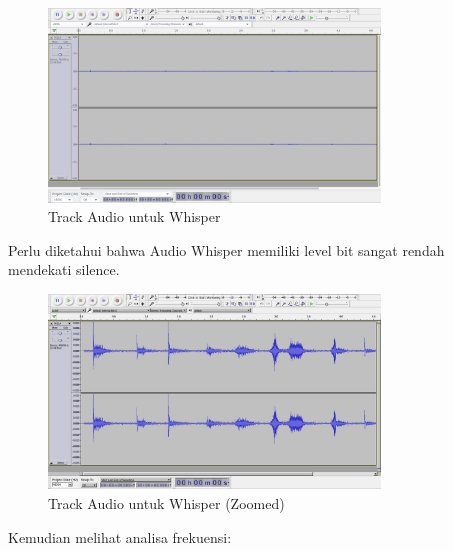 \documentclass[12pt,]{article}
\begin{document}
	\begin{figure}[!ht]
		\centering
		\includegraphics[width=250pt]{images/elitech_testAudioWhisperOri}
		\caption{Track Audio untuk Whisper}
	\end{figure}
	
	\newpage
	Perlu diketahui bahwa Audio Whisper memiliki level bit sangat rendah mendekati silence.
	
	\begin{figure}[!ht]
		\centering
		\includegraphics[width=250pt]{images/elitech_testAudioWhisper}
		\caption{Track Audio untuk Whisper (Zoomed)}
	\end{figure}

	Kemudian melihat analisa frekuensi:
	
\end{document}
